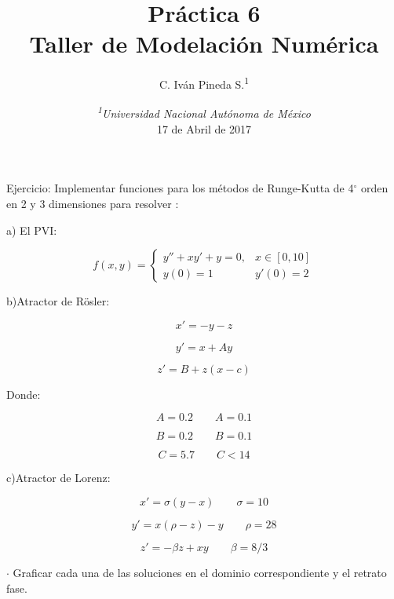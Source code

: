 \documentclass[12pt,letterpaper]{article}
\author{C. Iván Pineda S.\textsuperscript{1} }
\title{Práctica 6\\ Taller de Modelación Numérica}
\date {\textit{\textsuperscript{1}Universidad Nacional Autónoma de México}
\\ 17 de Abril de 2017}
\begin{document}
\maketitle

Ejercicio: Implementar funciones para los métodos de Runge-Kutta de 4$^{\circ}$
orden en 2 y 3 dimensiones para resolver :

a) El PVI:

\[
f(x,y) = \left\lbrace
\begin{array}{ll}
y''+xy'+y=0, & x\in[0,10] \\
y(0)=1  & y'(0)=2
\end{array}
\right.
\]

b)Atractor de Rösler:

\[
x'=-y-z
\]

\[
y'=x+Ay
\]

\[
z'=B+z(x-c)
\]

Donde:

\[
A=0.2 \qquad A=0.1
\]

\[
B=0.2 \qquad B=0.1
\]

\[
C=5.7 \qquad C<14
\]

c)Atractor de Lorenz:

\[
x'=\sigma (y-x) \qquad \sigma=10
\]

\[
y'=x ( \rho - z ) - y \qquad \rho=28
\]

\[
z'=-\beta z+xy \qquad \beta=8/3
\]

$\cdot$ Graficar cada una de las soluciones en el dominio correspondiente y el
retrato fase.
\end{document}
